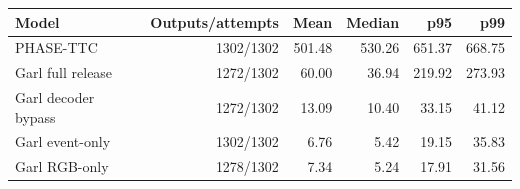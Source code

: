 \begin{tabular}{lrrrrr}
\toprule
Model & Outputs/attempts & Mean & Median & p95 & p99 \\
\midrule
PHASE-TTC & 1302/1302 & 501.48 & 530.26 & 651.37 & 668.75 \\
Garl full release & 1272/1302 & 60.00 & 36.94 & 219.92 & 273.93 \\
Garl decoder bypass & 1272/1302 & 13.09 & 10.40 & 33.15 & 41.12 \\
Garl event-only & 1302/1302 & 6.76 & 5.42 & 19.15 & 35.83 \\
Garl RGB-only & 1278/1302 & 7.34 & 5.24 & 17.91 & 31.56 \\
\bottomrule
\end{tabular}
